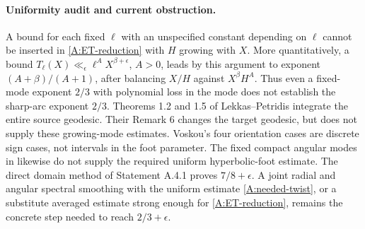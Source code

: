 \paragraph{Uniformity audit and current obstruction.}
A bound for each fixed $\ell$ with an unspecified constant depending on
$\ell$ cannot be inserted in \eqref{A:ET-reduction} with $H$ growing
with $X$. More quantitatively, a bound
$T_\ell(X)\ll_\epsilon \ell^A X^{\beta+\epsilon}$, $A>0$, leads by this
argument to exponent $(A+\beta)/(A+1)$, after balancing $X/H$ against
$X^\beta H^A$. Thus even a fixed-mode exponent $2/3$ with polynomial
loss in the mode does not establish the sharp-arc exponent $2/3$.
Theorems 1.2 and 1.5 of Lekkas--Petridis integrate the entire source
geodesic. Their Remark 6 changes the target geodesic, but does not
supply these growing-mode estimates. Voskou's four orientation cases
\cite{Voskou2024} are discrete sign cases, not intervals in the foot
parameter. The fixed compact angular modes in
\cite[Theorem 1.1]{BourgainKontorovichSarnak2010} likewise do not
supply the required uniform hyperbolic-foot estimate.
The direct domain method of Statement A.4.1 proves $7/8+\epsilon$.
A joint radial and angular spectral smoothing with the uniform
estimate \eqref{A:needed-twist}, or a substitute averaged estimate
strong enough for \eqref{A:ET-reduction}, remains the concrete step
needed to reach $2/3+\epsilon$.
